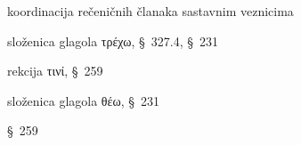 \begin{description}[noitemsep]
\item[οἵ τε\dots\ καὶ οἱ] koordinacija rečeničnih članaka sastavnim veznicima
\item[ἐξέτρεχον] složenica glagola τρέχω, §~327.4, §~231
\item[βοηθήσοντες] rekcija τινί, §~259
\item[ἐσέθεον] složenica glagola θέω, §~231
\item[ἀνύσοντες] §~259

\end{description}


